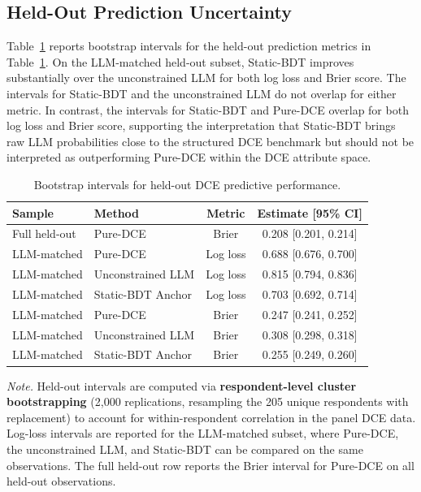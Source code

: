 \documentclass[11pt]{article}
\begin{document}
\subsection{Held-Out Prediction Uncertainty}

Table~\ref{tab:bootstrap_heldout} reports bootstrap intervals for the held-out prediction metrics in Table~\ref{tab:bootstrap_heldout}. On the LLM-matched held-out subset, Static-BDT improves substantially over the unconstrained LLM for both log loss and Brier score. The intervals for Static-BDT and the unconstrained LLM do not overlap for either metric. In contrast, the intervals for Static-BDT and Pure-DCE overlap for both log loss and Brier score, supporting the interpretation that Static-BDT brings raw LLM probabilities close to the structured DCE benchmark but should not be interpreted as outperforming Pure-DCE within the DCE attribute space.

\begin{table}[h]
\centering
\caption{Bootstrap intervals for held-out DCE predictive performance.}
\label{tab:bootstrap_heldout}
\small
\begin{tabular}{l l c c}
\toprule
Sample & Method & Metric & Estimate [95\% CI] \\
\midrule
Full held-out & Pure-DCE & Brier & 0.208 [0.201, 0.214] \\
\midrule
LLM-matched & Pure-DCE & Log loss & 0.688 [0.676, 0.700] \\
LLM-matched & Unconstrained LLM & Log loss & 0.815 [0.794, 0.836] \\
LLM-matched & Static-BDT Anchor & Log loss & 0.703 [0.692, 0.714] \\
\midrule
LLM-matched & Pure-DCE & Brier & 0.247 [0.241, 0.252] \\
LLM-matched & Unconstrained LLM & Brier & 0.308 [0.298, 0.318] \\
LLM-matched & Static-BDT Anchor & Brier & 0.255 [0.249, 0.260] \\
\bottomrule
\end{tabular}

\vspace{0.4em}
\begin{minipage}{0.95\textwidth}
\small
\textit{Note.} Held-out intervals are computed via \textbf{respondent-level cluster bootstrapping} (2,000 replications, resampling the 205 unique respondents with replacement) to account for within-respondent correlation in the panel DCE data. Log-loss intervals are reported for the LLM-matched subset, where Pure-DCE, the unconstrained LLM, and Static-BDT can be compared on the same observations. The full held-out row reports the Brier interval for Pure-DCE on all held-out observations.
\end{minipage}
\end{table}
\end{document}
